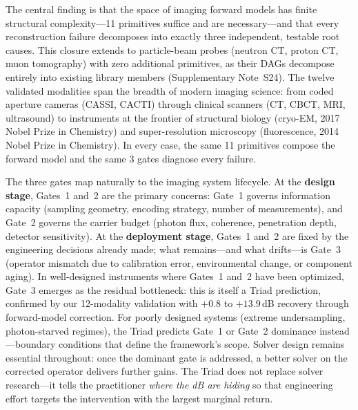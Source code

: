 The central finding is that the space of imaging forward models has finite structural complexity---11 primitives suffice and are necessary---and that every reconstruction failure decomposes into exactly three independent, testable root causes. This closure extends to particle-beam probes (neutron CT, proton CT, muon tomography) with zero additional primitives, as their DAGs decompose entirely into existing library members (Supplementary Note~S24). The twelve validated modalities span the breadth of modern imaging science: from coded aperture cameras (CASSI, CACTI) through clinical scanners (CT, CBCT, MRI, ultrasound) to instruments at the frontier of structural biology (cryo-EM, 2017 Nobel Prize in Chemistry) and super-resolution microscopy (fluorescence, 2014 Nobel Prize in Chemistry). In every case, the same 11 primitives compose the forward model and the same 3 gates diagnose every failure.

The three gates map naturally to the imaging system lifecycle. At the \textbf{design stage}, Gates~1 and~2 are the primary concerns: Gate~1 governs information capacity (sampling geometry, encoding strategy, number of measurements), and Gate~2 governs the carrier budget (photon flux, coherence, penetration depth, detector sensitivity). At the \textbf{deployment stage}, Gates~1 and~2 are fixed by the engineering decisions already made; what remains---and what drifts---is Gate~3 (operator mismatch due to calibration error, environmental change, or component aging). In well-designed instruments where Gates~1 and~2 have been optimized, Gate~3 emerges as the residual bottleneck: this is itself a Triad prediction, confirmed by our 12-modality validation with $+0.8$ to $+13.9$\,dB recovery through forward-model correction. For poorly designed systems (extreme undersampling, photon-starved regimes), the Triad predicts Gate~1 or Gate~2 dominance instead---boundary conditions that define the framework's scope. Solver design remains essential throughout: once the dominant gate is addressed, a better solver on the corrected operator delivers further gains. The Triad does not replace solver research---it tells the practitioner \emph{where the dB are hiding} so that engineering effort targets the intervention with the largest marginal return.

